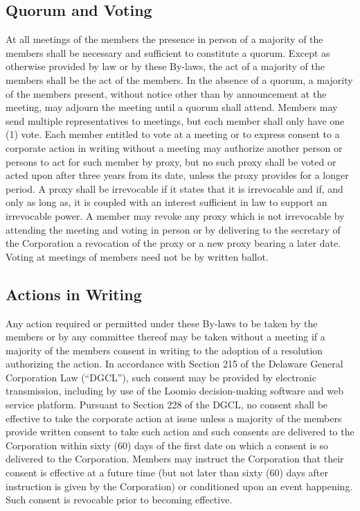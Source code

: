 \documentclass{article}
\begin{document}
\subsection{Quorum and Voting}
At all meetings of the members the presence in person of a majority of the members shall be necessary and sufficient to constitute a quorum. Except as otherwise provided by law or by these By-laws, the act of a majority of the members shall be the act of the members. In the absence of a quorum, a majority of the members present, without notice other than by announcement at the meeting, may adjourn the meeting until a quorum shall attend. Members may send multiple representatives to meetings, but each member shall only have one (1) vote. Each member entitled to vote at a meeting or to express consent to a corporate action in writing without a meeting may authorize another person or persons to act for such member by proxy, but no such proxy shall be voted or acted upon after three years from its date, unless the proxy provides for a longer period. A proxy shall be irrevocable if it states that it is irrevocable and if, and only as long as, it is coupled with an interest sufficient in law to support an irrevocable power. A member may revoke any proxy which is not irrevocable by attending the meeting and voting in person or by delivering to the secretary of the Corporation a revocation of the proxy or a new proxy bearing a later date. Voting at meetings of members need not be by written ballot.
\subsection{Actions in Writing}
Any action required or permitted under these By-laws to be taken by the members or by any committee thereof may be taken without a meeting if a majority of the members consent in writing to the adoption of a resolution authorizing the action. In accordance with Section 215 of the Delaware General Corporation Law (“DGCL”), such consent may be provided by electronic transmission, including by use of the Loomio decision-making software and web service platform. Pursuant to Section 228 of the DGCL, no consent shall be effective to take the corporate action at issue unless a majority of the members provide written consent to take such action and such consents are delivered to the Corporation within sixty (60) days of the first date on which a consent is so delivered to the Corporation. Members may instruct the Corporation that their consent is effective at a future time (but not later than sixty (60) days after instruction is given by the Corporation) or conditioned upon an event happening. Such consent is revocable prior to becoming effective.
\end{document}
